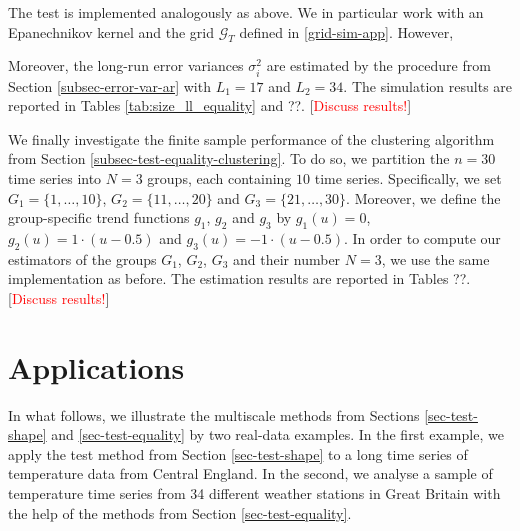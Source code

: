 The test is implemented analogously as above. We in particular work with an Epanechnikov kernel and the grid $\mathcal{G}_T$ defined in \eqref{grid-sim-app}. However, 

Moreover, the long-run error variances $\sigma_i^2$ are estimated by the procedure from Section \ref{subsec-error-var-ar} with $L_1 = 17$ and $L_2 = 34$. The simulation results are reported in Tables \ref{tab:size_ll_equality} and ??. [\textcolor{red}{Discuss results!}]


We finally investigate the finite sample performance of the clustering algorithm from Section \ref{subsec-test-equality-clustering}. To do so, we partition the $n = 30$ time series into $N=3$ groups, each containing $10$ time series. Specifically, we set $G_1 = \{1,\ldots,10\}$, $G_2 = \{11,\ldots,20\}$ and $G_3 =  \{21,\ldots,30\}$. Moreover, we define the group-specific trend functions $g_1$, $g_2$ and $g_3$ by $g_1(u) = 0$, $g_2(u) = 1 \cdot (u - 0.5)$ and $g_3(u) =  - 1 \cdot (u - 0.5)$. In order to compute our estimators of the groups $G_1$, $G_2$, $G_3$ and their number $N = 3$, we use the same implementation as before. The estimation results are reported in Tables ??. [\textcolor{red}{Discuss results!}]   




\section{Applications}\label{sec-data}


In what follows, we illustrate the multiscale methods from Sections \ref{sec-test-shape} and \ref{sec-test-equality} by two real-data examples. In the first example, we apply the test method from Section \ref{sec-test-shape} to a long time series of temperature data from Central England. In the second, we analyse a sample of temperature time series from 34 different weather stations in Great Britain with the help of the methods from Section \ref{sec-test-equality}. 


